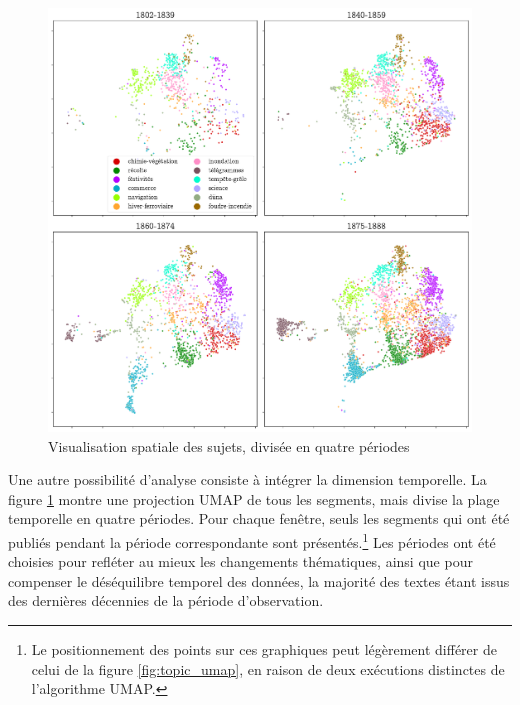 \documentclass[a4paper,twoside,12pt]{article}
\begin{document}
\begin{figure}[h]
    \centering
    \includegraphics[width=\textwidth]{images/topics_umap_periods.pdf}
    \caption{Visualisation spatiale des sujets, divisée en quatre périodes}
    \label{fig:topics_umap_periods}
\end{figure}

Une autre possibilité d'analyse consiste à intégrer la dimension temporelle. La figure \ref{fig:topics_umap_periods} montre une projection UMAP de tous les segments, mais divise la plage temporelle en quatre périodes. Pour chaque fenêtre, seuls les segments qui ont été publiés pendant la période correspondante sont présentés.\footnote{Le positionnement des points sur ces graphiques peut légèrement différer de celui de la figure \ref{fig:topic_umap}, en raison de deux exécutions distinctes de l'algorithme UMAP.} Les périodes ont été choisies pour refléter au mieux les changements thématiques, ainsi que pour compenser le déséquilibre temporel des données, la majorité des textes étant issus des dernières décennies de la période d'observation.
\end{document}
